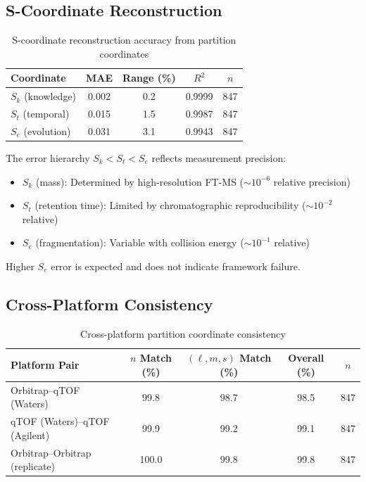 \subsection{S-Coordinate Reconstruction}

\begin{table}[h]
\centering
\caption{S-coordinate reconstruction accuracy from partition coordinates}
\label{tab:scoord}
\begin{tabular}{lcccc}
\toprule
\textbf{Coordinate} & \textbf{MAE} & \textbf{Range (\%)} & \textbf{$R^2$} & \textbf{$n$} \\
\midrule
$S_k$ (knowledge) & 0.002 & 0.2 & 0.9999 & 847 \\
$S_t$ (temporal) & 0.015 & 1.5 & 0.9987 & 847 \\
$S_e$ (evolution) & 0.031 & 3.1 & 0.9943 & 847 \\
\bottomrule
\end{tabular}
\end{table}

\begin{remark}
The error hierarchy $S_k < S_t < S_e$ reflects measurement precision:
\begin{itemize}
    \item $S_k$ (mass): Determined by high-resolution FT-MS ($\sim 10^{-6}$ relative precision)
    \item $S_t$ (retention time): Limited by chromatographic reproducibility ($\sim 10^{-2}$ relative)
    \item $S_e$ (fragmentation): Variable with collision energy ($\sim 10^{-1}$ relative)
\end{itemize}
Higher $S_e$ error is expected and does not indicate framework failure.
\end{remark}

\subsection{Cross-Platform Consistency}

\begin{table}[h]
\centering
\caption{Cross-platform partition coordinate consistency}
\label{tab:crossplatform}
\begin{tabular}{lcccc}
\toprule
\textbf{Platform Pair} & \textbf{$n$ Match (\%)} & \textbf{$({\ell, m, s})$ Match (\%)} & \textbf{Overall (\%)} & \textbf{$n$} \\
\midrule
Orbitrap–qTOF (Waters) & 99.8 & 98.7 & 98.5 & 847 \\
qTOF (Waters)–qTOF (Agilent) & 99.9 & 99.2 & 99.1 & 847 \\
Orbitrap–Orbitrap (replicate) & 100.0 & 99.8 & 99.8 & 847 \\
\bottomrule
\end{tabular}
\end{table}

